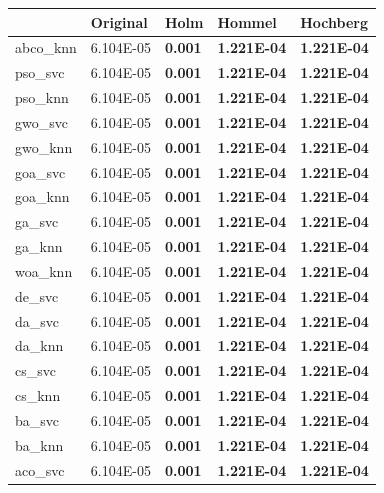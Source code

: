 \begin{table}[htp]
    \centering
    \begin{tabular}{lllll}
        \toprule
        {}        & Original  & Holm           & Hommel             & Hochberg           \\
        \midrule
        abco\_knn & 6.104E-05 & \textbf{0.001} & \textbf{1.221E-04} & \textbf{1.221E-04} \\
        pso\_svc  & 6.104E-05 & \textbf{0.001} & \textbf{1.221E-04} & \textbf{1.221E-04} \\
        pso\_knn  & 6.104E-05 & \textbf{0.001} & \textbf{1.221E-04} & \textbf{1.221E-04} \\
        gwo\_svc  & 6.104E-05 & \textbf{0.001} & \textbf{1.221E-04} & \textbf{1.221E-04} \\
        gwo\_knn  & 6.104E-05 & \textbf{0.001} & \textbf{1.221E-04} & \textbf{1.221E-04} \\
        goa\_svc  & 6.104E-05 & \textbf{0.001} & \textbf{1.221E-04} & \textbf{1.221E-04} \\
        goa\_knn  & 6.104E-05 & \textbf{0.001} & \textbf{1.221E-04} & \textbf{1.221E-04} \\
        ga\_svc   & 6.104E-05 & \textbf{0.001} & \textbf{1.221E-04} & \textbf{1.221E-04} \\
        ga\_knn   & 6.104E-05 & \textbf{0.001} & \textbf{1.221E-04} & \textbf{1.221E-04} \\
        woa\_knn  & 6.104E-05 & \textbf{0.001} & \textbf{1.221E-04} & \textbf{1.221E-04} \\
        de\_svc   & 6.104E-05 & \textbf{0.001} & \textbf{1.221E-04} & \textbf{1.221E-04} \\
        da\_svc   & 6.104E-05 & \textbf{0.001} & \textbf{1.221E-04} & \textbf{1.221E-04} \\
        da\_knn   & 6.104E-05 & \textbf{0.001} & \textbf{1.221E-04} & \textbf{1.221E-04} \\
        cs\_svc   & 6.104E-05 & \textbf{0.001} & \textbf{1.221E-04} & \textbf{1.221E-04} \\
        cs\_knn   & 6.104E-05 & \textbf{0.001} & \textbf{1.221E-04} & \textbf{1.221E-04} \\
        ba\_svc   & 6.104E-05 & \textbf{0.001} & \textbf{1.221E-04} & \textbf{1.221E-04} \\
        ba\_knn   & 6.104E-05 & \textbf{0.001} & \textbf{1.221E-04} & \textbf{1.221E-04} \\
        aco\_svc  & 6.104E-05 & \textbf{0.001} & \textbf{1.221E-04} & \textbf{1.221E-04} \\

\end{tabular}
\end{table}
